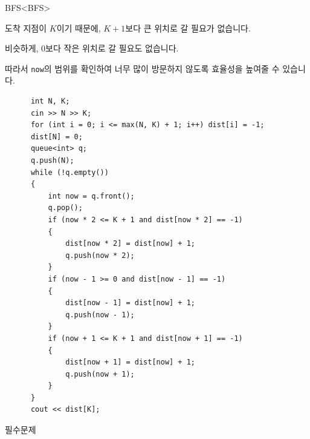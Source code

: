 \begin{frame}[fragile]{BFS}{<BFS>}
  \begin{twocol}
    도착 지점이 $K$이기 때문에, $K{+}1$보다 큰 위치로 갈 필요가 없습니다.\par\vspace{2mm}
    \par\vspace{2mm}
    비슷하게, 0보다 작은 위치로 갈 필요도 없습니다.\par\vspace{2mm}
    따라서 \texttt{now}의 범위를 확인하여 너무 많이 방문하지 않도록 효율성을 높여줄 수
    있습니다.
  \colsplit
    \begin{verbatim}
      int N, K;
      cin >> N >> K;
      for (int i = 0; i <= max(N, K) + 1; i++) dist[i] = -1;
      dist[N] = 0;
      queue<int> q;
      q.push(N);
      while (!q.empty())
      {
          int now = q.front();
          q.pop();
          if (now * 2 <= K + 1 and dist[now * 2] == -1)
          {
              dist[now * 2] = dist[now] + 1;
              q.push(now * 2);
          }
          if (now - 1 >= 0 and dist[now - 1] == -1)
          {
              dist[now - 1] = dist[now] + 1;
              q.push(now - 1);
          }
          if (now + 1 <= K + 1 and dist[now + 1] == -1)
          {
              dist[now + 1] = dist[now] + 1;
              q.push(now + 1);
          }
      }
      cout << dist[K];
    \end{verbatim}
  \end{twocol}
\end{frame}


\begin{frame}{필수문제}
  \begin{columns}[T]
  \end{columns}
\end{frame}

